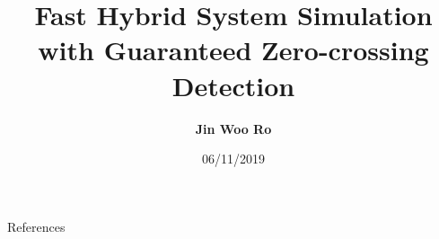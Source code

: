 \documentclass[compress,t,xcolor=table,dvipsnames]{beamer}
\title[]{ Fast Hybrid System Simulation with Guaranteed Zero-crossing Detection }
\author[]{
	\large \textbf{Jin Woo Ro}
}
\date[]{
	06/11/2019
}
\institute[University of Auckland]
{
	\texttt{[image: fig/UOA-HC-RGB.png]}
}
\begin{document}
\frame{\titlepage}






%


%

%

\begin{frame}[t,allowframebreaks]{References} %
	\printbibliography
\end{frame}

\appendix

\end{document}
